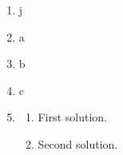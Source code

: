 \documentclass[12pt,twoside]{article}
\makeatletter
\def\emptycleardoublepage{\clearpage\if@twoside \ifodd\c@page\else
\thispagestyle{empty}%
\hbox{}\newpage\if@twocolumn\hbox{}\newpage\fi\fi\fi}
\makeatother
\begin{document}
\begin{multicols}{2}
\begin{enumerate}
 \end{enumerate}\end{multicols}\emptycleardoublepage{}\graphicspath{{C:/Users/iainc/anaconda3/Randomizer/Sample Course/Sample Assessment/}}\begin{multicols}{2} \begin{enumerate}\item j\item a\item b\item c\def \a{7}\def \atwoone{1}\def \atwotwo{3}\def \atwothree{5}\def \btwothree{7}\def \sumtwothree{12}\def \diftwothree{-2}\def \bigtwothree{500}\def \powtwothree{16807}\def \logtwothree{0.8270874753469162}\def \factortwothree{51}\def \atwofour{1.24}\def \btwofour{1.451}\def \tooshorttwofour{10.1}\def \moneytwofour{10.10}\def \longertwofour{10.10000}\def \atwofive{0.12}\def \btwofive{0.12346}\def \athreeone{4}\def \bthreeone{6}\def \setthreetwo{[12, 6, 9]}\def \athreetwo{12}\def \bthreetwo{6}\def \cthreetwo{9}\def \controlthreethree{-5}\def \athreethree{3}\def \topthreethree{0}\def \athreefour{5}\def \bthreefour{2}\def \listthreefour{[1, 2, 3, 4]}\def \afourone{4}\def \bfourone{-8}\def \fracfourone{\frac{-1}{2}}\def \rootfourtwo{8}\def \simplifiedfourtwo{2 \sqrt{2}}\def \sqrtlistfourtwo{[2, 2]}\def \outfourtwo{2}\def \infourtwo{2}\def \wowfourtwo{1}\def \afourthree{0}\def \nicethreefour{3x^{2}-x^{}}\def \nastythreefour{xyz^{3}}\def \cfourthree{-4}\def \dfourthree{9}\def \infourthree{-4x^{}}\def \outfourthree{+9y^{}}\def \afourfour{1159420}\def \nicefourfour{1,159,420}\def \goodfourfour{1,000,000.12345}\def \badfourfour{1,000,000.1}
\item \begin{enumerate}
\item First solution.
\item Second solution.
\end{enumerate}

\end{enumerate}
\end{multicols}
\end{document}
